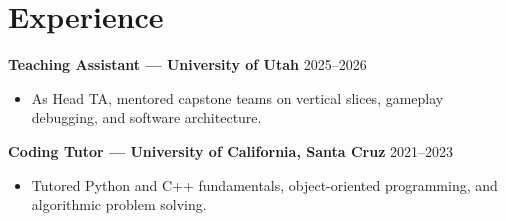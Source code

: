 \documentclass[10pt,letterpaper]{extarticle}
\begin{document}
\section*{Experience}
\textbf{Teaching Assistant --- University of Utah} \hfill 2025--2026
\begin{itemize}
\item As Head TA, mentored capstone teams on vertical slices, gameplay debugging, and software architecture.
\end{itemize}
\vspace{2.15pt}
\textbf{Coding Tutor --- University of California, Santa Cruz} \hfill 2021--2023
\begin{itemize}
\item Tutored Python and C++ fundamentals, object-oriented programming, and algorithmic problem solving.
\end{itemize}
\end{document}
